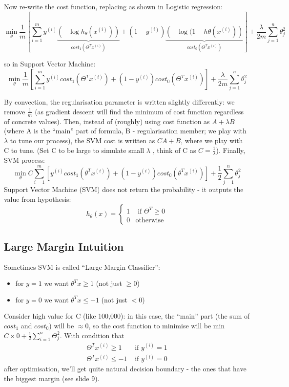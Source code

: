 \documentclass{scrartcl}
\begin{document}
Now re-write the cost function, replacing as shown in Logistic
regression:
\[\min \limits _\theta \frac{1}{m} \left[\sum \limits_{i=1}^{m}
  y^{(i)} \underbrace{\left(- \log h_\theta
      (x^{(i)})\right)}_{cost_1(\Theta^Tx^{(i)})} + (1-y^{(i)})
  \underbrace{\left(-\log(1 - h\theta(x^{(i)})
    \right)}_{cost_0(\Theta^Tx^{(i)})} \right] + \frac{\lambda}{2m}
\sum \limits_{j=1}^{n}\theta_j^2 \]

so in Support Vector Machine:
\[\min \limits _\theta \frac{1}{m} \left[\sum \limits_{i=1}^{m}
  y^{(i)}cost_1(\Theta^Tx^{(i)}) + (1-y^{(i)}) cost_0(\Theta^Tx^{(i)})
\right] + \frac{\lambda}{2m} \sum \limits_{j=1}^{n}\theta_j^2 \]

By convection, the regularisation parameter is written slightly
differently: we remove $\frac{1}{m}$ (as gradient descent will find
the minimum of cost function regardless of concrete values). Then,
instead of (roughly) using cost function as $A + \lambda B$ (where A
is the ``main'' part of formula, B - regularisation member; we play
with $\lambda$ to tune our process), the SVM cost is written as $C A +
B$, where we play with C to tune. (Set C to be large to simulate small
$\lambda$ , think of C as $C = \frac{1}{\lambda}$). Finally, SVM
process:
\[\min \limits _\theta C \sum \limits_{i=1}^{m} \left[
  y^{(i)}cost_1(\theta^Tx^{(i)}) + (1-y^{(i)}) cost_0(\theta^Tx^{(i)})
\right] + \frac{1}{2} \sum \limits_{j=1}^{n}\theta_j^2 \]
Support Vector Machine (SVM) does not return the probability - it
outputs the value from hypothesis:
\[ h_\theta(x) = \left\{
  \begin{array}{cc}
    1 & \textrm{ if } \Theta^T \geq 0\\
    0 & \textrm{otherwise}
  \end{array}
\right. \]

\subsection{Large Margin Intuition}
\label{sec:12-2}

Sometimes SVM is called ``Large Margin Classifier'':
\begin{itemize}
\item for $y = 1$ we want $\theta^T x \geq 1$ (not just $\geq 0$)
\item for $y = 0$ we want $\theta^T x \leq -1$ (not just $< 0$)
\end{itemize}

Consider high value for C (like 100,000): in this case, the ``main''
part (the sum of $cost_1$ and $cost_0$) will be $\approx 0$, so the
cost function to minimise will be min $ C \times 0 + \frac{1}{2} \sum
\limits_{i=1}^{n} \Theta_j^2$. With condition that
\[ \begin{array}{cc}
  \Theta^T x^{(i)} \geq 1 & \textrm{ if } y^{(i)} = 1 \\
  \Theta^T x^{(i)} \leq -1 & \textrm{ if } y^{(i)} = 0
\end{array} \]
after optimisation, we'll get quite natural decision boundary - the
ones that have the biggest margin  (see slide 9).
\end{document}
